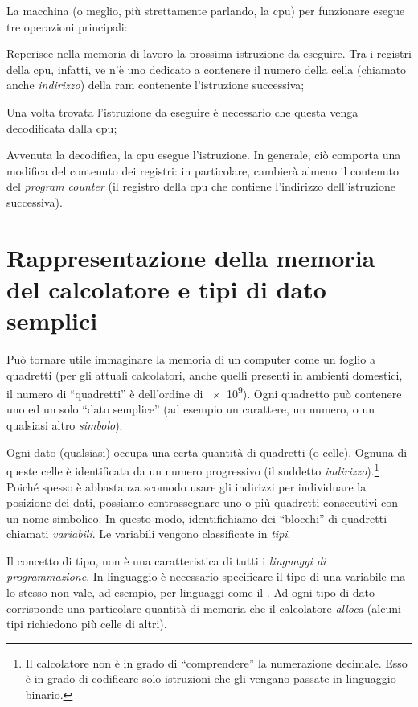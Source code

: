 La  macchina (o meglio, più strettamente parlando, la \ac{cpu}) per funzionare esegue tre operazioni principali:
\begin{description}[]
	\item
[Fetch\index{fetch}] Reperisce nella memoria di lavoro la prossima istruzione da eseguire.
Tra i registri della \ac{cpu}, infatti, ve n'è uno dedicato a contenere il numero della cella (chiamato anche \emph{indirizzo}) della \ac{ram} contenente l'istruzione successiva;
	\item
[Decode\index{decode}] Una volta trovata l'istruzione da eseguire è necessario che questa venga decodificata dalla \ac{cpu};
	\item
[Execute\index{execute}] Avvenuta la decodifica, la \ac{cpu} esegue l'istruzione.
In generale, ciò comporta una modifica del contenuto dei registri: in particolare, cambierà almeno il contenuto del \emph{program counter} (il registro della \ac{cpu} che contiene l'indirizzo dell'istruzione successiva).
\end{description}

	\section{Rappresentazione della memoria del calcolatore e tipi di dato semplici}
	\label{sec:mem}
Può tornare utile immaginare la memoria di un computer come un foglio a quadretti (per gli attuali calcolatori, anche quelli presenti in ambienti domestici, il numero di ``quadretti'' è dell'ordine di \num{e9}). Ogni quadretto può contenere uno ed un solo ``dato semplice'' (ad esempio un carattere, un numero, o un qualsiasi altro \emph{simbolo}).

Ogni dato (qualsiasi) occupa una certa quantità di quadretti (o celle).
Ognuna di queste celle è identificata da un numero progressivo (il suddetto \emph{indirizzo}).\footnote{Il calcolatore non è in grado di ``comprendere'' la numerazione decimale. Esso è in grado di codificare solo istruzioni che gli vengano passate in linguaggio binario.}
Poiché spesso è abbastanza scomodo usare gli indirizzi per individuare la posizione dei dati, possiamo contrassegnare uno o più quadretti consecutivi con un nome simbolico.
In questo modo, identifichiamo dei ``blocchi'' di quadretti  chiamati \emph{variabili}. Le variabili vengono classificate in \emph{tipi}.

Il concetto di tipo, non è una caratteristica di tutti i \emph{linguaggi di programmazione}.
In linguaggio  è necessario specificare il tipo di una variabile ma lo stesso non vale, ad esempio, per linguaggi come il .
Ad ogni tipo di dato corrisponde una particolare quantità di memoria che il calcolatore \emph{alloca} (alcuni tipi richiedono più celle di altri).

